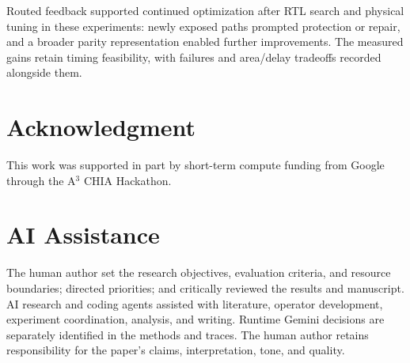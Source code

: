 \documentclass[conference,10pt]{IEEEtran}
\begin{document}
Routed feedback supported continued optimization after RTL search and physical tuning in these experiments: newly exposed paths prompted protection or repair, and a broader parity representation enabled further improvements. The measured gains retain timing feasibility, with failures and area/delay tradeoffs recorded alongside them.
\section*{Acknowledgment}
This work was supported in part by short-term compute funding from Google through the A$^3$ CHIA Hackathon.

\section*{AI Assistance}

The human author set the research objectives, evaluation criteria, and resource boundaries; directed priorities; and critically reviewed the results and manuscript. AI research and coding agents assisted with literature, operator development, experiment coordination, analysis, and writing. Runtime Gemini decisions are separately identified in the methods and traces. The human author retains responsibility for the paper's claims, interpretation, tone, and quality.
\end{document}
